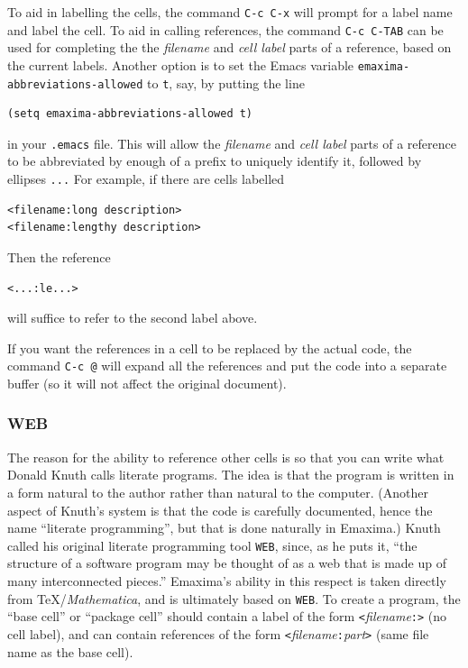 To aid in labelling the cells, the command \texttt{C-c C-x}
will prompt for a label name and label the
cell.  To aid in calling references, the command \texttt{C-c C-TAB}
can be used for completing the
the \textsl{filename} and \textsl{cell label} parts of a reference, 
based on the current labels.  
Another option is to set the Emacs variable
\texttt{emaxima-abbreviations-allowed} to \texttt{t}, say, by putting
the line
\begin{verbatim}
(setq emaxima-abbreviations-allowed t)
\end{verbatim}
\noindent
in your \texttt{.emacs} file.  This will allow the \textsl{filename}
and \textsl{cell label} parts of a reference to be abbreviated by enough
of a prefix to uniquely identify it, followed by ellipses
\texttt{...}
For example, if there are cells labelled
\begin{verbatim}
<filename:long description>
<filename:lengthy description>
\end{verbatim}
\noindent
Then the reference
\begin{verbatim}
<...:le...>
\end{verbatim}
\noindent
will suffice to refer to the second label above.

If you want the references in a cell to be replaced by the actual
code, the command \texttt{C-c @} will expand all the
references and put the code into a separate buffer (so it will not
affect the original document).

\subsubsection{WEB}

\noindent
The reason for the ability to reference other cells is so that you can
write what Donald Knuth calls literate programs.  The idea is that the
program is written in a form natural to the author rather than natural
to the computer.  (Another aspect of Knuth's system is that the code
is carefully documented, hence the name ``literate programming'', but
that is done naturally in Emaxima.)  Knuth called his original
literate programming tool \texttt{WEB}, since, as he puts it,
``the structure of a software program may be thought of as a web that
is made up of many interconnected pieces.''  
Emaxima's ability in this respect is taken directly from
\TeX{}/\textit{Mathematica}, and is ultimately based on
\texttt{WEB}. To create a 
program, the ``base cell'' or ``package cell'' should contain 
a label of the form \texttt{<}\textsl{filename}\texttt{:>} 
(no cell label), and can
contain references of the form 
\texttt{<}\textsl{filename}\texttt{:}\textsl{part}\texttt{>}
(same file name as the base cell).  


